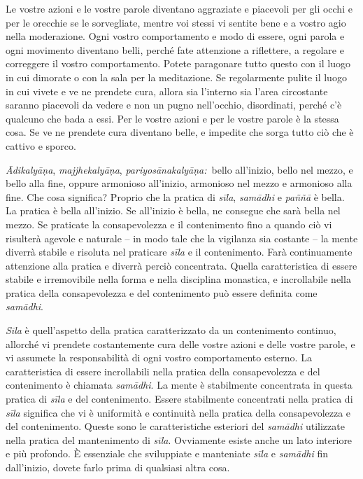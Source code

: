 Le vostre azioni e le vostre parole diventano aggraziate e piacevoli per
gli occhi e per le orecchie se le sorvegliate, mentre voi stessi vi
sentite bene e a vostro agio nella moderazione. Ogni vostro
comportamento e modo di essere, ogni parola e ogni movimento diventano
belli, perché fate attenzione a riflettere, a regolare e correggere il
vostro comportamento. Potete paragonare tutto questo con il luogo in cui
dimorate o con la sala per la meditazione. Se regolarmente pulite il
luogo in cui vivete e ve ne prendete cura, allora sia l'interno sia
l'area circostante saranno piacevoli da vedere e non un pugno
nell'occhio, disordinati, perché c'è qualcuno che bada a essi. Per le
vostre azioni e per le vostre parole è la stessa cosa. Se ve ne prendete
cura diventano belle, e impedite che sorga tutto ciò che è cattivo e
sporco.

\emph{Ādikalyāṇa}, \emph{majjhekalyāṇa}, \emph{pariyosānakalyāṇa:}~bello
all'inizio, bello nel mezzo, e bello alla fine, oppure armonioso
all'inizio, armonioso nel mezzo e armonioso alla fine. Che cosa
significa? Proprio che la pratica di \emph{sīla}, \emph{samādhi} e
\emph{paññā} è bella. La pratica è bella all'inizio. Se all'inizio è
bella, ne consegue che sarà bella nel mezzo. Se praticate la
consapevolezza e il contenimento fino a quando ciò vi risulterà agevole
e naturale -- in modo tale che la vigilanza sia costante -- la mente
diverrà stabile e risoluta nel praticare \emph{sīla} e il contenimento.
Farà continuamente attenzione alla pratica e diverrà perciò concentrata.
Quella caratteristica di essere stabile e irremovibile nella forma e
nella disciplina monastica, e incrollabile nella pratica della
consapevolezza e del contenimento può essere definita come
\emph{samādhi}.

\emph{Sīla} è quell'aspetto della pratica caratterizzato da un
contenimento continuo, allorché vi prendete costantemente cura delle
vostre azioni e delle vostre parole, e vi assumete la responsabilità di
ogni vostro comportamento esterno. La caratteristica di essere
incrollabili nella pratica della consapevolezza e del contenimento è
chiamata \emph{samādhi}. La mente è stabilmente concentrata in questa
pratica di \emph{sīla} e del contenimento. Essere stabilmente
concentrati nella pratica di \emph{sīla} significa che vi è uniformità e
continuità nella pratica della consapevolezza e del contenimento. Queste
sono le caratteristiche esteriori del \emph{samādhi} utilizzate nella
pratica del mantenimento di \emph{sīla}. Ovviamente esiste anche un lato
interiore e più profondo. È essenziale che sviluppiate e manteniate
\emph{sīla} e \emph{samādhi} fin dall'inizio, dovete farlo prima di
qualsiasi altra cosa.


